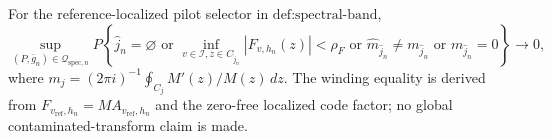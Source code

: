 For the reference-localized pilot selector in \(\text{def:spectral-band}\),
\[
 \sup_{(P,\bar g_n)\in\mathcal Q_{\mathrm{spec},n}}
 P\left\{\widehat j_n=\varnothing\text{ or }
 \inf_{v\in\mathcal I,z\in C_{\widehat j_n}}|F_{v,h_n}(z)|<\rho_F
 \text{ or }\widehat m_{\widehat j_n}\ne m_{\widehat j_n}
 \text{ or }m_{\widehat j_n}=0\right\}\longrightarrow0,
\]
where \(m_j=(2\pi i)^{-1}\oint_{C_j}M'(z)/M(z)\,dz\). The winding equality is derived from \(F_{v_{\mathrm{ref}},h_n}=MA_{v_{\mathrm{ref}},h_n}\) and the zero-free localized code factor; no global contaminated-transform claim is made.